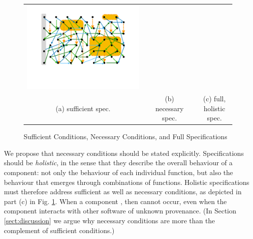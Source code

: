 \begin{figure}[htb]
\begin{tabular}{clclc}
\begin{minipage}{0.29\textwidth}
 \includegraphics[width=\linewidth, trim=100  120 130 60,clip]{diagrams/neccSuffYellowAll.pdf}
 \end{minipage}
\\
(a) sufficient  spec.& & (b) necessary spec. & & (c) full, holistic spec.
 \end{tabular}
  \vspace*{-2.5mm}
  \caption{Sufficient Conditions, Necessary Conditions, and Full Specifications}
 \label{fig:NecessaryAndSuff}
 \end{figure}
 
 

 
 
 We propose that  necessary conditions should be stated
 explicitly. Specifications should be \emph{holistic}, in the sense
 that they describe the  overall behaviour of a component: not only the
 behaviour of each individual function, but also  the
 behaviour that emerges through combinations of functions.
%
Holistic specifications must therefore address sufficient as well as necessary conditions, as  
depicted in part (c)    in Fig. \ref{fig:NecessaryAndSuff}.
When a component ,
then  cannot occur, even when the
component interacts with other software of unknown provenance.
(In Section \ref{sect:discussion} we argue why necessary conditions are more than the complement of
sufficient conditions.)

